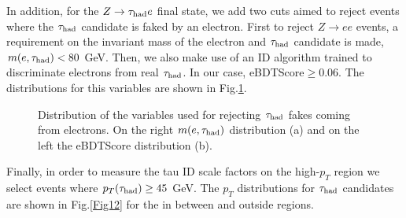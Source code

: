 In addition, for the $Z\to\tau_\text{had} e$ final state, we add two cuts aimed to reject events where the $\tau_\text{had}$ candidate is faked by an electron. First to reject $Z\to ee$ events, a requirement on the invariant mass of the electron and $\tau_\text{had}$ candidate is made, $m(e,\tau_\text{had})<80$ GeV. Then, we also make use of an ID algorithm trained to discriminate electrons from real $\tau_\text{had}$. In our case, eBDTScore$\geq 0.06$. The distributions for this variables are shown in Fig.\ref{Fig11}.
\begin{figure}[ht]
	\centering
	\hfill
	\caption{Distribution of the variables used for rejecting $\tau_\text{had}$ fakes coming from electrons. On the right $m(e,\tau_\text{had})$ distribution (a) and on the left the eBDTScore distribution (b).}
	\label{Fig11}
\end{figure}
Finally, in order to measure the tau ID scale factors on the high-$p_T$ region we select events where $p_T(\tau_\text{had})\geq 45$ GeV. The $p_T$ distributions for $\tau_\text{had}$ candidates are shown in Fig.\ref{Fig12} for the in between and outside regions.
